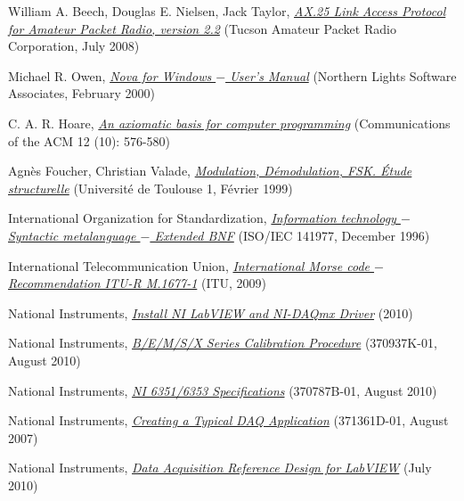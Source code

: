 \documentclass[twocolumn,pre,floats,aps,amsmath,amssymb]{revtex4}
\begin{document}
\begin{thebibliography}{99}
William A. Beech, Douglas E. Nielsen, Jack Taylor, {\it \href{http://www.tapr.org/pdf/AX25.2.2.pdf}{AX.25 Link Access Protocol for Amateur Packet Radio, version 2.2}} (Tucson Amateur Packet Radio Corporation, July 2008)

Michael R. Owen, {\it \href{http://www.nlsa.com/docs/nfwdoc.pdf}{Nova for Windows $-$ User's Manual}} (Northern Lights Software Associates, February 2000)

C. A. R. Hoare, {\it \href{http://www.spatial.maine.edu/~worboys/processes/hoare%20axiomatic.pdf}{An axiomatic basis for computer programming}} (Communications of the ACM 12 (10): 576-580)

Agn\`es Foucher, Christian Valade, {\it \href{http://radiomods.free.fr/r2000-info/mod_dem_fsk.pdf}{Modulation, D\'emodulation, FSK. \'Etude structurelle}} (Universit\'e de Toulouse 1, F\'evrier 1999)

International Organization for Standardization, {\it \href{http://standards.iso.org/ittf/PubliclyAvailableStandards/s026153_ISO_IEC_14977_1996(E).zip}{Information technology $-$ Syntactic metalanguage $-$ Extended BNF}} (ISO/IEC 141977, December 1996)

International Telecommunication Union, {\it \href{http://www.itu.int/rec/R-REC-M.1677-1-200910-I/}{International Morse code $-$ Recommendation ITU-R M.1677-1}} (ITU, 2009)

National Instruments, {\it \href{http://www.ni.com/gettingstarted/installsoftware/dataacquisition.htm}{Install NI LabVIEW and NI-DAQmx Driver}} (2010)

National Instruments, {\it \href{http://www.ni.com/pdf/manuals/370937k.pdf}{B/E/M/S/X Series Calibration Procedure}} (370937K-01, August 2010)

National Instruments, {\it \href{http://www.ni.com/pdf/manuals/370787b.pdf}{NI 6351/6353 Specifications}} (370787B-01, August 2010)

National Instruments, {\it \href{http://zone.ni.com/reference/en-XX/help/371361D-01/lvmeasconcepts/creating_daq_app/}{Creating a Typical DAQ Application}} (371361D-01, August 2007)

National Instruments, {\it \href{http://zone.ni.com/devzone/cda/tut/p/id/11805}{Data Acquisition Reference Design for LabVIEW}} (July 2010)


\end{thebibliography}
\end{document}
